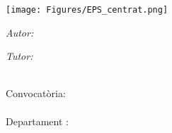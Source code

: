 

\begin{titlepage}

\setlength{\parskip}{0pt}

\begin{center}
\texttt{[image: Figures/EPS\_centrat.png]}

\vspace{2cm}

{\Large \studyprog\par}                      %
\vspace{0.2cm}
\vspace{3.5cm}                            
\textsc{\Large \ttype}                                 %
\vspace{0.2cm}

\HRule 
\vspace{0.4cm}
{\huge \bfseries \ttitle\par}                          %
\vspace{0.4cm}  
\HRule
\vspace{1cm}
 
\begin{minipage}[t]{0.4\textwidth}
\begin{flushleft} 
    \large
    \emph{Autor:}\\
    \authorname
\end{flushleft}
\end{minipage}
\begin{minipage}[t]{0.4\textwidth}
\begin{flushright} 
    \large
    \emph{Tutor:} \\
    \supnameA \\
    \supnameB
\end{flushright}
\end{minipage}

\vspace{2.5cm}
 \textsc{\Large \tdocument}                                 %
\vspace{0.2cm}

\vfill

{\large
Convocatòria:\\                                %
\tdate\\
\vspace{1.5cm}
Departament :\\
\deptname\\                                    %
}
\vfill
\end{center}
\end{titlepage}
\restoregeometry
